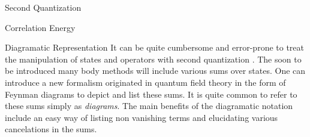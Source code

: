 \documentclass[twoside,english]{uiofysmaster}
\begin{document}
\begin{chapter}{Second Quantization}
\begin{section}{Correlation Energy}
	\end{section}
 
\end{chapter}



\begin{chapter}{Diagramatic Representation}
	It can be quite cumbersome and error-prone to treat the manipulation of states and operators with second quantization \cite{ShavittAndBartlett}. The soon to be introduced many body methods will include various sums over states. One can introduce a new formalism originated in quantum field theory in the form of Feynman diagrams to depict and list these sums. It is quite common to refer to these sums simply as \textit{diagrams}. The main benefits of the diagramatic notation include an easy way of listing non vanishing terms and elucidating various cancelations in the sums. 


\end{chapter}
\end{document}
